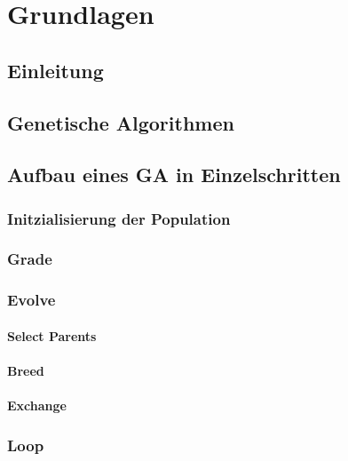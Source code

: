 
\section{Grundlagen}
\label{sec:Grundlagen}
\subsection{Einleitung}

\subsection{Genetische Algorithmen}

\subsection{Aufbau eines GA in Einzelschritten}
\subsubsection{Initzialisierung der Population}
\subsubsection{Grade}
\subsubsection{Evolve}
\paragraph{Select Parents}
\paragraph{Breed}
\paragraph{Exchange}
\subsubsection{Loop}


